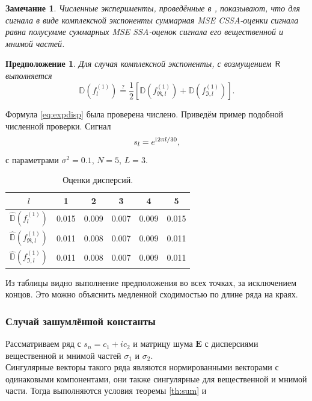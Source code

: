 \documentclass[12pt,a4paper]{article}
\newtheorem{remark}{Замечание}%
\newtheorem*{prop*}{Предположение}
\begin{document}
\begin{remark}
Численные эксперименты, проведённые в \cite{Golyandina.etal2013}, показывают, что для сигнала в виде комплексной экспоненты суммарная MSE CSSA-оценки сигнала равна полусумме суммарных MSE SSA-оценок сигнала его вещественной и мнимой частей.
\end{remark}

\begin{prop*}
	Для случая комплексной экспоненты, с возмущением $\textsf{R}$ выполняется
	\begin{equation} \label{eq:expdisp}
		\mathbb{D}(f^{(1)}_l) \stackrel{?}{=} \frac{1}{2}[\mathbb{D}(f^{(1)}_{\Re, l}) + \mathbb{D}(f^{(1)}_{\Im, l})].
	\end{equation}
\end{prop*}

Формула \eqref{eq:expdisp} была проверена числено. Приведём пример подобной численной проверки.
Сигнал $$s_l = e^{\mathrm{i}\mkern1mu 2 \pi l / 30},$$
с параметрами $\sigma^2 = 0.1$, $N = 5$, $L = 3$.

\begin{table}[H]
	\begin{center}
		\caption{Оценки дисперсий.}
		\label{tab:pi_div_2}
		\begin{tabular}{|c|c|c|c|c|c|}
			\hline
			$l$	& 1 & 2 & 3 & 4 & 5\\
			\hline
			$\hat{\mathbb{D}}(f^{(1)}_l)$ & 0.015  & 0.009  & 0.007 & 0.009 & 0.015\\
			\hline
			$\hat{\mathbb{D}}(f^{(1)}_{\Re, l})$ & 0.011 & 0.008 & 0.007 & 0.009 & 0.011\\
			\hline
			$\hat{\mathbb{D}}(f^{(1)}_{\Im, l})$ & 0.011  & 0.008  & 0.007 & 0.009 & 0.011\\
			\hline
		\end{tabular}
	\end{center}
\end{table}

Из таблицы видно выполнение предположения во всех точках, за исключением концов. Это можно объяснить медленной сходимостью по длине ряда на краях.

\subsubsection{Случай зашумлённой константы}

Рассматриваем ряд с $s_n = c_1 + ic_2$ и матрицу шума $\mathbf{E}$ с дисперсиями вещественной и мнимой частей $\sigma_1$ и $\sigma_2$.\\
Сингулярные векторы такого ряда являются нормированными векторами с одинаковыми компонентами, они также сингулярные для вещественной и мнимой части. Тогда выполняются условия теоремы \ref{th:sum} и
\end{document}
